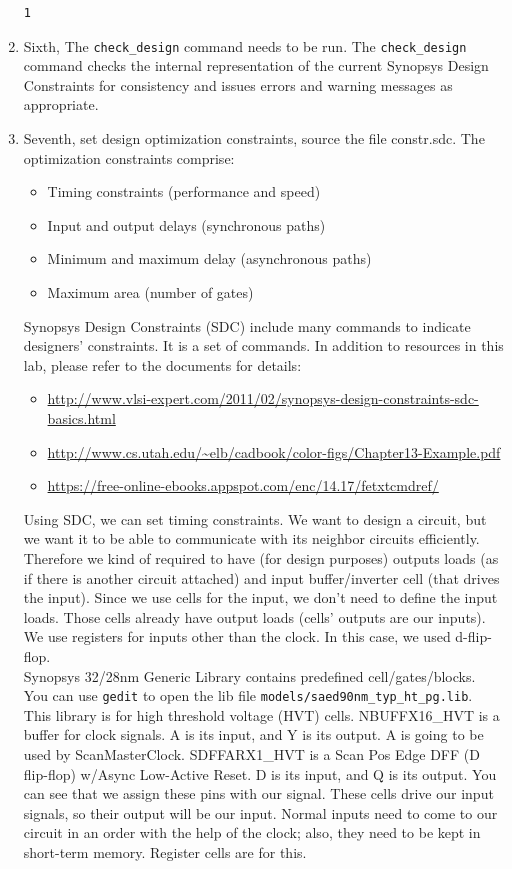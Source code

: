 \documentclass[a4paper,12pt,twoside]{article}
\begin{document}
\begin{enumerate}
\begin{verbatim}
1
    \end{verbatim}
    \item Sixth, The \texttt{check\_design} command needs to be run. The \texttt{check\_design} command checks the internal representation of the current Synopsys Design Constraints for consistency and issues errors and warning messages as appropriate.
    \item Seventh, set design optimization constraints, source the file constr.sdc. The optimization constraints comprise:
    \begin{itemize}
        \item Timing constraints (performance and speed)
        \item Input and output delays (synchronous paths)
        \item Minimum and maximum delay (asynchronous paths)
        \item Maximum area (number of gates)
    \end{itemize}
    Synopsys Design Constraints (SDC) include many commands to indicate designers' constraints. It is a set of commands. In addition to resources in this lab, please refer to the documents for details:
    \begin{itemize}
        \item \url{http://www.vlsi-expert.com/2011/02/synopsys-design-constraints-sdc-basics.html}
        \item \url{http://www.cs.utah.edu/~elb/cadbook/color-figs/Chapter13-Example.pdf}
        \item \url{https://free-online-ebooks.appspot.com/enc/14.17/fetxtcmdref/}
    \end{itemize}
    Using SDC, we can set timing constraints. We want to design a circuit, but we want it to be able to communicate with its neighbor circuits efficiently. Therefore we kind of required to have (for design purposes) outputs loads (as if there is another circuit attached) and input buffer/inverter cell (that drives the input). Since we use cells for the input, we don't need to define the input loads. Those cells already have output loads (cells' outputs are our inputs). We use registers for inputs other than the clock. In this case, we used d-flip-flop.\\
    Synopsys 32/28nm Generic Library contains predefined cell/gates/blocks. You can use \texttt{gedit} to open the lib file \texttt{models/saed90nm\_typ\_ht\_pg.lib}. This library is for high threshold voltage (HVT) cells. NBUFFX16\_HVT is a buffer for clock signals. A is its input, and Y is its output. A is going to be used by ScanMasterClock. SDFFARX1\_HVT is a Scan Pos Edge DFF (D flip-flop) w/Async Low-Active Reset. D is its input, and Q is its output. You can see that we assign these pins with our signal. These cells drive our input signals, so their output will be our input. Normal inputs need to come to our circuit in an order with the help of the clock; also, they need to be kept in short-term memory. Register cells are for this.\\

\end{enumerate}
\end{document}
